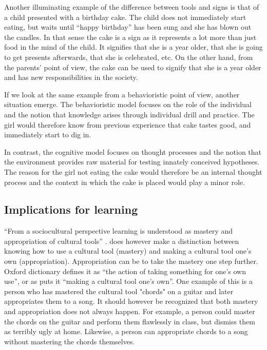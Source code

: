 Another illuminating example of the difference between tools and signs is that of a child presented with a birthday cake. The child does not immediately start eating, but waits until “happy birthday” has been sung and she has blown out the candles. In that sense the cake is a sign as it represents a lot more than just food in the mind of the child. It signifies that she is a year older, that she is going to get presents afterwards, that she is celebrated, etc. On the other hand, from the parents’ point of view, the cake can be used to signify that she is a year older and has new responsibilities in the society. 

If we look at the same example from a behavioristic point of view, another situation emerge. The behavioristic model focuses on the role of the individual and the notion that knowledge arises through individual drill and practice. The girl would therefore know from previous experience that cake tastes good, and immediately start to dig in. 

In contrast, the cognitive model focuses on thought processes and the notion that the environment provides raw material for testing innately conceived hypotheses. The reason for the girl not eating the cake would therefore be an internal thought process and the context in which the cake is placed would play a minor role. 

\subsection{Implications for learning}
“From a sociocultural perspective learning is understood as mastery and appropriation of cultural tools” \citetext{Wertsch, 1998, Säljö, 1999, 2001, cited in \citealp{mifsud2010reconsidering}}. \citet{wertsch1998mind} does however make a distinction between knowing how to use a cultural tool (mastery) and making a cultural tool one’s own (appropriation). Appropriation can be to take the mastery one step further. Oxford dictionary defines it as “the action of taking something for one’s own use”, or as \citet{wertsch1998mind} puts it “making a cultural tool one’s own”. One example of this is a person who has mastered the cultural tool "chords" on a guitar and later appropriates them to a song. It should however be recognized that both mastery and appropriation does not always happen. For example, a person could master the chords on the guitar and perform them flawlessly in class, but dismiss them as terribly ugly at home. Likewise, a person can appropriate chords to a song without mastering the chords themselves.

